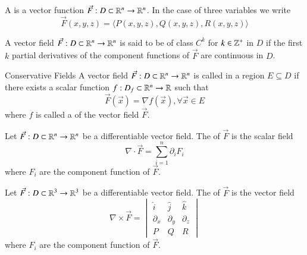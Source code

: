 \documentclass[12pt]{report}
\begin{document}
\begin{appendices}
    \begin{defn}{}{}
        A  is a vector function $\vec{F}:D\subset \mathbb R^n \rightarrow \mathbb R^n$. In the case of three variables we write \begin{equation}
            \vec{F}(x,y,z) = \langle P(x,y,z), Q(x,y,z), R(x,y,z)\rangle
        \end{equation}
    \end{defn}
    
    \begin{rmk}{}{}
        A vector field $\vec{F}:D\subset \mathbb R^n \rightarrow \mathbb R^n$ is said to be of class $C^k$ for $k \in \mathbb Z^{+}$ in $D$ if the first $k$ partial derivatives of the component functions of $\vec{F}$ are continuous in $D$.
    \end{rmk}
    
    \begin{defn}{Conservative Fields}{}
        A vector field $\vec{F}:D\subset \mathbb R^n \rightarrow \mathbb R^n$ is called  in a region $E \subseteq D$ if there exists a scalar function $f:D_f \subset \mathbb R^n \rightarrow \mathbb R$ such that \begin{equation}
            \vec{F}(\vec{x}) = \nabla f(\vec{x}), \forall \vec{x} \in E
        \end{equation}
        where $f$ is called a  of the vector field $\vec{F}$.
    \end{defn}
    
    \begin{defn}{}{}
        Let $\vec{F}:D\subset \mathbb R^n \rightarrow \mathbb R^n$ be a differentiable vector field. The  of $\vec{F}$ is the scalar field \begin{equation}
            \nabla\cdot \vec{F} = \sum\limits_{i=1}^n\partial_iF_i
        \end{equation}
        where $F_i$ are the component function of $\vec{F}$.
    \end{defn}
    
    \begin{defn}{}{}
        Let $\vec{F}:D\subset \mathbb R^3 \rightarrow \mathbb R^3$ be a differentiable vector field. The  of $\vec{F}$ is the vector field \begin{equation}
            \nabla\times \vec{F} = \begin{vmatrix} \hat{i} & \hat{j} & \hat{k} \\ \partial_x & \partial_y & \partial_z \\ P & Q & R \end{vmatrix}
        \end{equation}
        where $F_i$ are the component function of $\vec{F}$.
    \end{defn}
    

\end{appendices}
\end{document}
